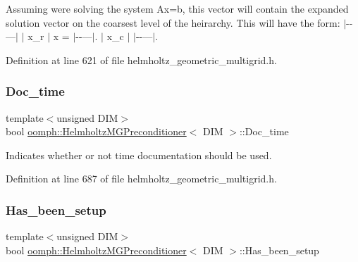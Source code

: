 Assuming we\textquotesingle{}re solving the system Ax=b, this vector will contain the expanded solution vector on the coarsest level of the heirarchy. This will have the form\+: $\vert$-\/-\/---$\vert$ $\vert$ x\+\_\+r $\vert$ x = $\vert$-\/-\/---$\vert$. $\vert$ x\+\_\+c $\vert$ $\vert$-\/-\/---$\vert$. 



Definition at line 621 of file helmholtz\+\_\+geometric\+\_\+multigrid.\+h.

\mbox{\label{classoomph_1_1HelmholtzMGPreconditioner_a74fc85625ca9007857e14f38c6cbc260}} 
\subsubsection{\texorpdfstring{Doc\+\_\+time}{Doc\_time}}
{\footnotesize\ttfamily template$<$unsigned D\+IM$>$ \\
bool \hyperlink{classoomph_1_1HelmholtzMGPreconditioner}{oomph\+::\+Helmholtz\+M\+G\+Preconditioner}$<$ D\+IM $>$\+::Doc\+\_\+time\hspace{0.3cm}{\ttfamily [private]}}



Indicates whether or not time documentation should be used. 



Definition at line 687 of file helmholtz\+\_\+geometric\+\_\+multigrid.\+h.

\mbox{\label{classoomph_1_1HelmholtzMGPreconditioner_a5f55a8429e948ec42cad90add3b74488}} 
\subsubsection{\texorpdfstring{Has\+\_\+been\+\_\+setup}{Has\_been\_setup}}
{\footnotesize\ttfamily template$<$unsigned D\+IM$>$ \\
bool \hyperlink{classoomph_1_1HelmholtzMGPreconditioner}{oomph\+::\+Helmholtz\+M\+G\+Preconditioner}$<$ D\+IM $>$\+::Has\+\_\+been\+\_\+setup\hspace{0.3cm}{\ttfamily [private]}}



